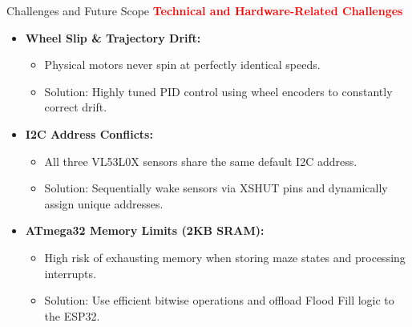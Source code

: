 \documentclass{beamer}
\begin{document}
\begin{frame}{Challenges and Future Scope}
  \transfade[duration=0.1]
  \textcolor{red}{\textbf{\large Technical and Hardware-Related Challenges}}
  \vspace{0.5em}
  \begin{itemize}[<+->]
    \item \textbf{Wheel Slip \& Trajectory Drift:} 
      \begin{itemize}[<+->]
        \item Physical motors never spin at perfectly identical speeds.
        \item Solution: Highly tuned PID control using wheel encoders to constantly correct drift.
      \end{itemize}
    \item \textbf{I2C Address Conflicts:} 
      \begin{itemize}[<+->]
        \item All three VL53L0X sensors share the same default I2C address.
        \item Solution: Sequentially wake sensors via XSHUT pins and dynamically assign unique addresses.
      \end{itemize}
    \item \textbf{ATmega32 Memory Limits (2KB SRAM):} 
      \begin{itemize}[<+->]
        \item High risk of exhausting memory when storing maze states and processing interrupts.
        \item Solution: Use efficient bitwise operations and offload Flood Fill logic to the ESP32.
      \end{itemize}
  \end{itemize}
\end{frame}
\end{document}
